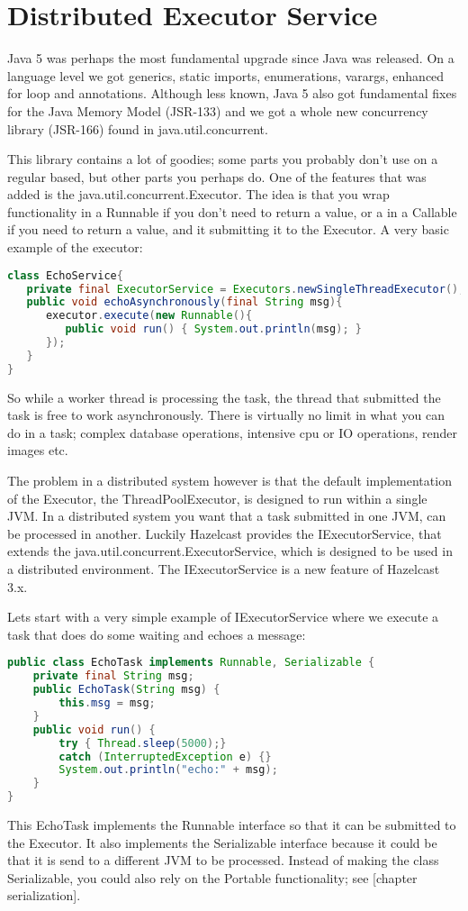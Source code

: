 \chapter{Distributed Executor Service}
Java 5 was perhaps the most fundamental upgrade since Java was released. On a language level we got generics, static imports, enumerations, varargs, enhanced for loop and annotations. Although less known, Java 5 also got fundamental fixes for the Java Memory Model (JSR-133) and we got a whole new concurrency library (JSR-166) found in java.util.concurrent.

This library contains a lot of goodies; some parts you probably don't use on a regular based, but other parts you perhaps do. One of the features that was added is the java.util.concurrent.Executor. The idea is that you wrap functionality in a Runnable if you don't need to return a value, or a in a Callable if you need to return a value, and it submitting it to the Executor. A very basic example of the executor:
\begin{lstlisting}[language=java]
class EchoService{
   private final ExecutorService = Executors.newSingleThreadExecutor();
   public void echoAsynchronously(final String msg){
      executor.execute(new Runnable(){
         public void run() { System.out.println(msg); }
      });	
   }
}
\end{lstlisting}
So while a worker thread is processing the task, the thread that submitted the task is free to work asynchronously. There is virtually no limit in what you can do in a task; complex database operations, intensive cpu or IO operations, render images etc. 

The problem in a distributed system however is that the default implementation of the Executor, the ThreadPoolExecutor, is designed to run within a single JVM. In a distributed system you want that a task submitted in one JVM, can be processed in another. Luckily Hazelcast provides the IExecutorService, that extends the java.util.concurrent.ExecutorService, which is designed to be used in a distributed environment. The IExecutorService is a new feature of Hazelcast 3.x.

Lets start with a very simple example of IExecutorService where we execute a task that does do some waiting and echoes a message:
\begin{lstlisting}[language=java]
public class EchoTask implements Runnable, Serializable {
    private final String msg;
    public EchoTask(String msg) {
        this.msg = msg;
    }
    public void run() {
        try { Thread.sleep(5000);} 
        catch (InterruptedException e) {}
        System.out.println("echo:" + msg);
    }
}
\end{lstlisting}
This EchoTask implements the Runnable interface so that it can be submitted to the Executor. It also implements the Serializable interface because it could be that it is send to a different JVM to be processed. Instead of making the class Serializable, you could also rely on the Portable functionality; see [chapter serialization]. 

